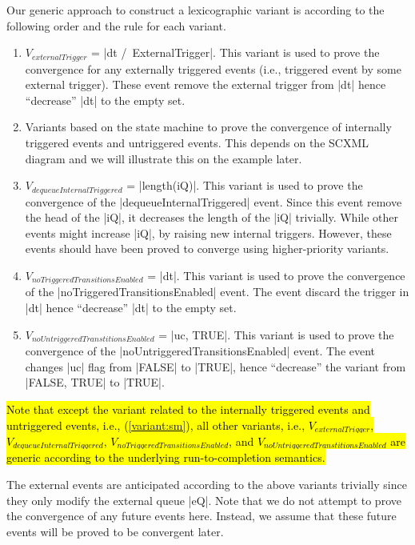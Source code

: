 Our generic approach to construct a lexicographic variant is according
to the following order and the rule for each variant.
\begin{enumerate}
\item $V_{externalTrigger}$ = |dt /\ ExternalTrigger|.  This variant
  is used to prove the convergence for any externally triggered events
  (i.e., triggered event by some external trigger). These event remove
  the external trigger from |dt| hence ``decrease'' |dt| to the empty
  set.

\item \label{variant:sm} Variants based on the state machine to prove
  the convergence of internally triggered events and untriggered
  events.  This depends on the SCXML diagram and we will illustrate
  this on the example later.
  
\item $V_{dequeueInternalTriggered}$ = |length(iQ)|.  This variant is
  used to prove the convergence of the |dequeueInternalTriggered| event.
  Since this event remove the head of the |iQ|, it decreases the
  length of the |iQ| trivially.  While other events might increase
  |iQ|, by raising new internal triggers. However, these events should
  have been proved to converge using higher-priority variants.
  
\item $V_{noTriggeredTransitionsEnabled}$ = |dt|.  This variant is used to
  prove the convergence of the |noTriggeredTransitionsEnabled| event.
  The event discard the trigger in |dt| hence ``decrease'' |dt| to the
  empty set.
  
\item $V_{noUntriggeredTranstitionsEnabled}$ = |{uc, TRUE}|.  This variant is
  used to prove the convergence of the
  |noUntriggeredTransitionsEnabled| event.  The event changes |uc|
  flag from |FALSE| to |TRUE|, hence ``decrease'' the variant from
  |{FALSE, TRUE}| to |{TRUE}|.
\end{enumerate}
\hl{%
  Note that except the variant related to the internally triggered
  events and untriggered events, i.e., \mbox{(\ref{variant:sm})}, all
  other variants, i.e., $V_{externalTrigger}$,
  $V_{dequeueInternalTriggered}$, $V_{noTriggeredTransitionsEnabled}$,
  and $V_{noUntriggeredTranstitionsEnabled}$ are generic according to
  the underlying run-to-completion semantics.%
}

The external events are anticipated according to the above variants
trivially since they only modify the external queue |eQ|.  Note that
we do not attempt to prove the convergence of any future events
here. Instead, we assume that these future events will be proved to be
convergent later.

